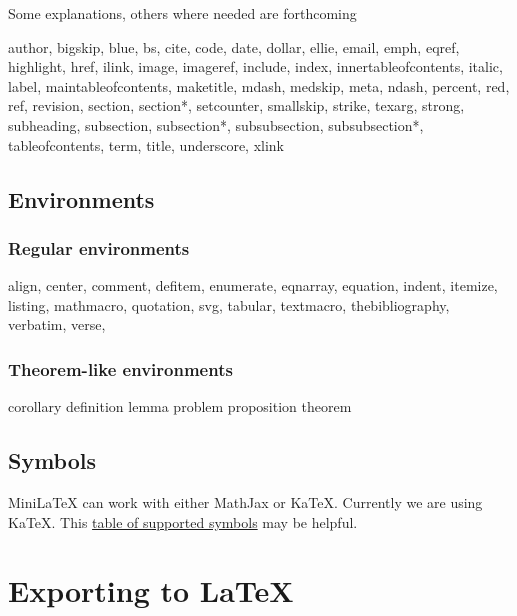 Some explanations, others where needed are forthcoming

\begin{indent}
author,
bigskip,
blue,
bs,
cite,
code,
date,
dollar,
ellie,
email,
emph,
eqref,
highlight,
href,
ilink,
image,
imageref,
include,
index,
innertableofcontents,
italic,
label,
maintableofcontents,
maketitle,
mdash,
medskip,
meta,
ndash,
percent,
red,
ref,
revision,
section,
section*,
setcounter,
smallskip,
strike,
texarg,
strong,
subheading,
subsection,
subsection*,
subsubsection,
subsubsection*,
tableofcontents,
term,
title,
underscore,
xlink
\end{indent}

\subsection{Environments}

\subsubsection{Regular environments}

\begin{indent}
align,
center,
comment,
defitem,
enumerate,
eqnarray,
equation,
indent,
itemize,
listing,
mathmacro,
quotation,
svg,
tabular,
textmacro,
thebibliography,
verbatim,
verse,
\end{indent}

\subsubsection{Theorem-like environments}

\begin{indent}
corollary
definition
lemma
problem
proposition
theorem
\end{indent}



\subsection{Symbols}

MiniLaTeX can work with either MathJax or KaTeX.  Currently we are using KaTeX.  This
\href{https://katex.org/docs/support_table.html}{table of supported symbols} may be helpful.


\section{Exporting to LaTeX}

